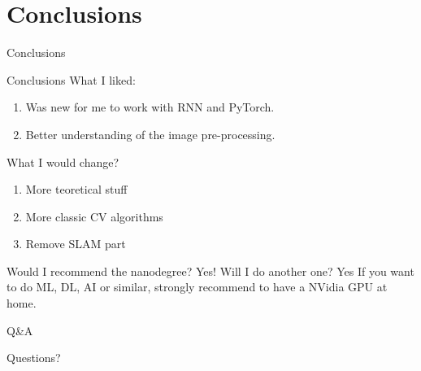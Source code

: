 \documentclass{beamer}
\begin{document}
\section{Conclusions}
\begin{frame}
\begin{center}
\Huge Conclusions
\end{center}
\end{frame}

\begin{frame}{Conclusions}
What I liked:
\begin{enumerate}
\item Was new for me to work with RNN and PyTorch.
\item Better understanding of the image pre-processing.
\end{enumerate}
\vfill
What I would change?
\begin{enumerate}
\item More teoretical stuff
\item More classic CV algorithms
\item Remove SLAM part
\end{enumerate}
\vfill
Would I recommend the nanodegree? Yes!
\vfill
Will I do another one? Yes
\vfill
If you want to do ML, DL, AI or similar, strongly recommend to have a NVidia GPU at home.
\end{frame}

\begin{frame}{Q\&A}
\begin{center}
\Huge Questions?
\end{center}
\end{frame}
\end{document}
